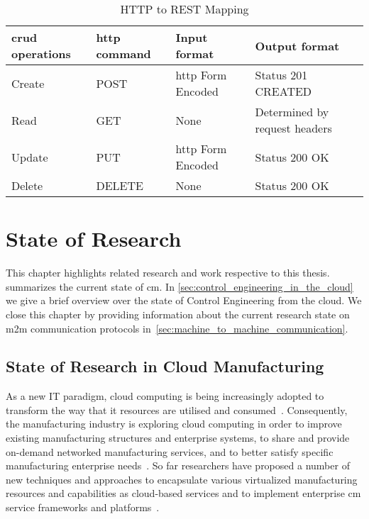 \documentclass[
a4paper,
twoside,
headsepline,
cleardoublepage=empty,
parskip=half,
draft=false
]{scrbook}
\begin{document}
			\begin{table}[hbtp]
				\centering
				\caption{HTTP to REST Mapping}
				\label{tab:http_rest_mapping}
				\begin{tabular}{@{}llll@{}}
					\toprule
					\gls{crud} operations & \gls{http} command & Input format & Output format
					\\ \midrule
					Create & POST & \gls{http} Form Encoded & Status 201 CREATED
					\\ \midrule
					Read & GET & None & Determined by request headers 
					\\ \midrule
					Update & PUT & \gls{http} Form Encoded & Status 200 OK
					\\ \midrule
					Delete & DELETE & None & Status 200 OK
					\\ \bottomrule
				\end{tabular}
			\end{table}

	\chapter{State of Research} \label{ch:state_of_the_Science}

		This chapter highlights related research and work respective to this thesis.  summarizes the current state of \gls{cm}. In \cref{sec:control_engineering_in_the_cloud} we give a brief overview over the state of Control Engineering from the cloud. We close this chapter by providing information about the current research state on \gls{m2m} communication protocols in~\cref{sec:machine_to_machine_communication}.

		\section{State of Research in Cloud Manufacturing}\label{sec:state_of_science_cloud_manufacturing}

			As a new IT paradigm, cloud computing is being increasingly adopted to transform the way that \gls{it} resources are utilised and consumed~\cite{li2010cloud}. 
			Consequently, the manufacturing industry is exploring cloud computing in order to improve existing manufacturing structures and enterprise systems, to
			share and provide on-demand networked manufacturing services, and to better satisfy specific manufacturing enterprise needs~\cite{he2015state}.
			So far researchers have proposed a number of new techniques and approaches to encapsulate various virtualized manufacturing resources and capabilities as cloud-based services and to implement enterprise \gls{cm} service frameworks and platforms~\cite{tao2011cloud}.
			
\end{document}
